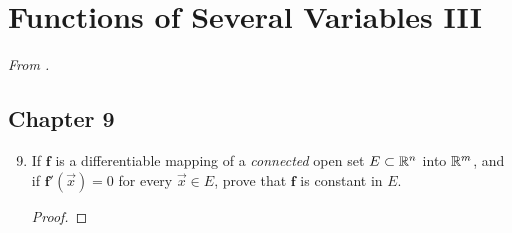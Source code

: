 \documentclass[../psets.tex]{subfiles}
\begin{document}
\section{Functions of Several Variables III}
\emph{From \textcite{bib:Rudin}.}
\subsection*{Chapter 9}
\begin{enumerate}[label={\textbf{\arabic*.}}]
    \setcounter{enumi}{8}
    \item {}If $\mathbf{f}$ is a differentiable mapping of a \emph{connected} open set $E\subset\mathbb{R}^n$ into $\mathbb{R}^m$, and if $\mathbf{f}'(\vec{x})=0$ for every $\vec{x}\in E$, prove that $\mathbf{f}$ is constant in $E$.
    \begin{proof}



\end{proof}
\end{enumerate}
\end{document}
